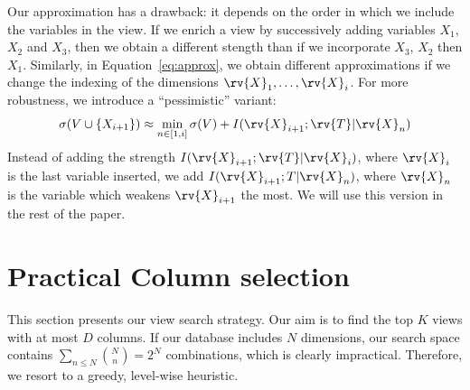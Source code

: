 Our approximation has a drawback: it depends on the order in which we include
the variables in the view. If we enrich a view by successively adding variables
$X_1$, $X_2$ and $X_3$, then we obtain a different stength than if we
incorporate $X_3$, $X_2$ then $X_1$. Similarly, in Equation~\ref{eq:approx}, we
obtain different approximations if we change the indexing of the dimensions
$\rv{X}_1, \ldots, \rv{X}_i$.  For more robustness, we introduce a
``pessimistic'' variant:
\begin{equation}\label{eq:robustapprox}
    \sigma(V \cup \{X_{i+1}\}) 
    \approx \min_{n \in [1, i]} \sigma(V) + I(\rv{X}_{i+1} ; \rv{T} | \rv{X}_{n})
\end{equation}
Instead of adding the strength $I(\rv{X}_{i+1}; \rv{T} | \rv{X}_i)$, where
$\rv{X}_i$ is the last variable inserted, we add $I(\rv{X}_{i+1}; T |
\rv{X}_n)$, where $\rv{X}_n$ is the variable which weakens $\rv{X}_{i+1}$ the
most. We will use this version in the rest of the paper.







\section{Practical Column selection}
\label{sec:column}

This section presents our view search strategy. Our aim is to find the top $K$
views with at most $D$ columns. If our database includes $N$ dimensions, our
search space contains $\sum_{n \leq N} \binom{N}{n} = 2^N$ combinations, which
is clearly impractical. Therefore, we resort to a  greedy, level-wise
heuristic.


